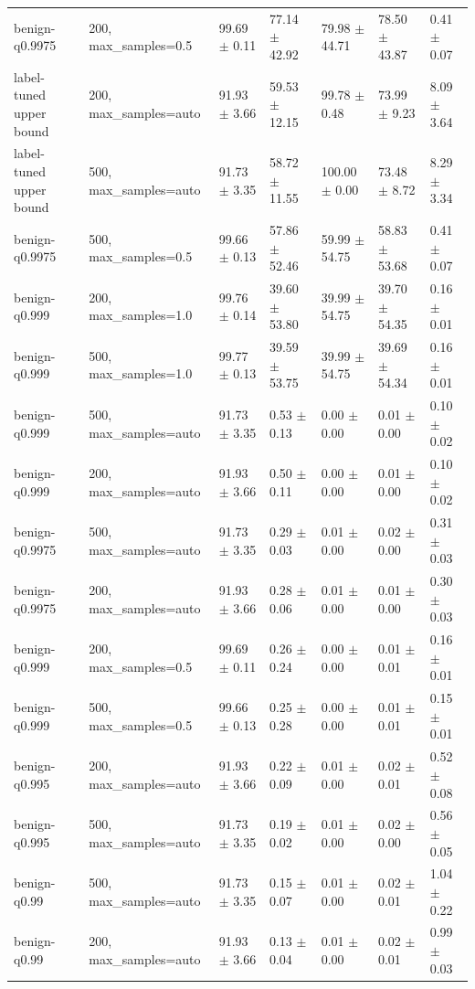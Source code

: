 \begin{tabular}{lllllll}
benign-q0.9975 & 200, max_samples=0.5 & 99.69 $\pm$ 0.11 & 77.14 $\pm$ 42.92 & 79.98 $\pm$ 44.71 & 78.50 $\pm$ 43.87 & 0.41 $\pm$ 0.07 \\
label-tuned upper bound & 200, max_samples=auto & 91.93 $\pm$ 3.66 & 59.53 $\pm$ 12.15 & 99.78 $\pm$ 0.48 & 73.99 $\pm$ 9.23 & 8.09 $\pm$ 3.64 \\
label-tuned upper bound & 500, max_samples=auto & 91.73 $\pm$ 3.35 & 58.72 $\pm$ 11.55 & 100.00 $\pm$ 0.00 & 73.48 $\pm$ 8.72 & 8.29 $\pm$ 3.34 \\
benign-q0.9975 & 500, max_samples=0.5 & 99.66 $\pm$ 0.13 & 57.86 $\pm$ 52.46 & 59.99 $\pm$ 54.75 & 58.83 $\pm$ 53.68 & 0.41 $\pm$ 0.07 \\
benign-q0.999 & 200, max_samples=1.0 & 99.76 $\pm$ 0.14 & 39.60 $\pm$ 53.80 & 39.99 $\pm$ 54.75 & 39.70 $\pm$ 54.35 & 0.16 $\pm$ 0.01 \\
benign-q0.999 & 500, max_samples=1.0 & 99.77 $\pm$ 0.13 & 39.59 $\pm$ 53.75 & 39.99 $\pm$ 54.75 & 39.69 $\pm$ 54.34 & 0.16 $\pm$ 0.01 \\
benign-q0.999 & 500, max_samples=auto & 91.73 $\pm$ 3.35 & 0.53 $\pm$ 0.13 & 0.00 $\pm$ 0.00 & 0.01 $\pm$ 0.00 & 0.10 $\pm$ 0.02 \\
benign-q0.999 & 200, max_samples=auto & 91.93 $\pm$ 3.66 & 0.50 $\pm$ 0.11 & 0.00 $\pm$ 0.00 & 0.01 $\pm$ 0.00 & 0.10 $\pm$ 0.02 \\
benign-q0.9975 & 500, max_samples=auto & 91.73 $\pm$ 3.35 & 0.29 $\pm$ 0.03 & 0.01 $\pm$ 0.00 & 0.02 $\pm$ 0.00 & 0.31 $\pm$ 0.03 \\
benign-q0.9975 & 200, max_samples=auto & 91.93 $\pm$ 3.66 & 0.28 $\pm$ 0.06 & 0.01 $\pm$ 0.00 & 0.01 $\pm$ 0.00 & 0.30 $\pm$ 0.03 \\
benign-q0.999 & 200, max_samples=0.5 & 99.69 $\pm$ 0.11 & 0.26 $\pm$ 0.24 & 0.00 $\pm$ 0.00 & 0.01 $\pm$ 0.01 & 0.16 $\pm$ 0.01 \\
benign-q0.999 & 500, max_samples=0.5 & 99.66 $\pm$ 0.13 & 0.25 $\pm$ 0.28 & 0.00 $\pm$ 0.00 & 0.01 $\pm$ 0.01 & 0.15 $\pm$ 0.01 \\
benign-q0.995 & 200, max_samples=auto & 91.93 $\pm$ 3.66 & 0.22 $\pm$ 0.09 & 0.01 $\pm$ 0.00 & 0.02 $\pm$ 0.01 & 0.52 $\pm$ 0.08 \\
benign-q0.995 & 500, max_samples=auto & 91.73 $\pm$ 3.35 & 0.19 $\pm$ 0.02 & 0.01 $\pm$ 0.00 & 0.02 $\pm$ 0.00 & 0.56 $\pm$ 0.05 \\
benign-q0.99 & 500, max_samples=auto & 91.73 $\pm$ 3.35 & 0.15 $\pm$ 0.07 & 0.01 $\pm$ 0.00 & 0.02 $\pm$ 0.01 & 1.04 $\pm$ 0.22 \\
benign-q0.99 & 200, max_samples=auto & 91.93 $\pm$ 3.66 & 0.13 $\pm$ 0.04 & 0.01 $\pm$ 0.00 & 0.02 $\pm$ 0.01 & 0.99 $\pm$ 0.03 \\
\bottomrule
\end{tabular}

